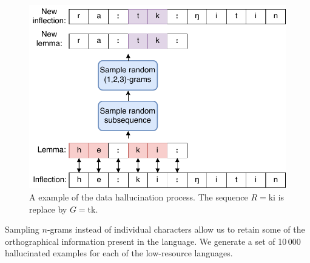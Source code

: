 \documentclass[11pt,a4paper]{article}
\begin{document}
\begin{figure}[h]
\centering
\includegraphics[scale=0.5]{hall.pdf}
\caption{\label{fig:hall} A example of the data hallucination process. The sequence $R=\text{ki}$ is replace by $G=\text{tk}$.}
\end{figure}


Sampling $n$-grams instead of individual characters allow us to retain
some of the orthographical information present in the
language.  We generate a set of 10\,000 hallucinated examples for each
of the low-resource languages.


\end{document}
